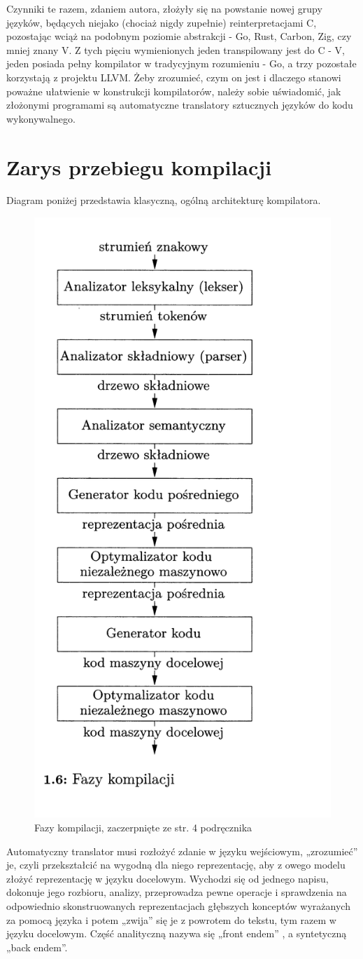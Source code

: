 Czynniki te razem, zdaniem autora, złożyły się na powstanie nowej grupy języków, będących niejako (chociaż nigdy zupełnie) reinterpretacjami C, pozostając wciąż na podobnym poziomie abstrakcji - Go, Rust, Carbon, Zig, czy mniej znany V.
Z tych pięciu wymienionych jeden transpilowany jest do C - V\cite{vlang_repo}, jeden posiada pełny kompilator w tradycyjnym rozumieniu - Go\cite{go_faq}, a trzy pozostałe korzystają z projektu LLVM\cite{rust_repo}\cite{carbon_repo}\cite{zig_repo}. Żeby zrozumieć, czym on jest i dlaczego stanowi poważne ułatwienie w konstrukcji kompilatorów, należy sobie uświadomić, jak złożonymi programami są automatyczne translatory sztucznych języków do kodu wykonywalnego. 
\clearpage

\section{Zarys przebiegu kompilacji}
Diagram poniżej przedstawia klasyczną, ogólną architekturę kompilatora.

\begin{figure}[H]
    \centering
    \includegraphics[height=0.8\linewidth]{images/wstep/fazy_kompilacji.png_bin.png}
    \caption{Fazy kompilacji, zaczerpnięte ze str. 4 podręcznika\cite{DRAGON_BOOK}}
\end{figure}

 
Automatyczny translator musi rozłożyć zdanie w języku wejściowym, „zrozumieć” je, czyli przekształcić na wygodną dla niego reprezentację, aby z owego modelu złożyć reprezentację w języku docelowym. Wychodzi się od jednego napisu, dokonuje jego rozbioru, analizy, przeprowadza pewne operacje i sprawdzenia na odpowiednio skonstruowanych reprezentacjach głębszych konceptów wyrażanych za pomocą języka i potem „zwija” się je z powrotem do tekstu, tym razem w języku docelowym. Część analityczną nazywa się „front endem” , a syntetyczną „back endem”.\cite[str.~4]{DRAGON_BOOK}

